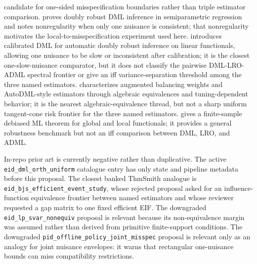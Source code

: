 \documentclass[11pt]{article}
\theoremstyle{definition}
\theoremstyle{plain}
\theoremstyle{remark}
\begin{document}
candidate for one-sided misspecification boundaries rather than triple
estimator comparison.
\citet{DukesVansteelandtWhitney2024DRDML} proves doubly robust DML inference in
semiparametric regression and notes nonregularity when only one nuisance is
consistent; that nonregularity motivates the local-to-misspecification
experiment used here.
\citet{vanDerLaanLuedtkeCarone2024CDML} introduces calibrated DML for automatic
doubly robust inference on linear functionals, allowing one nuisance to be slow
or inconsistent after calibration; it is the closest one-slow-nuisance
comparator, but it does not classify the pairwise DML-LRO-ADML spectral
frontier or give an iff variance-separation threshold among the three named
estimators.
\citet{BrunsSmithDukesFellerOgburn2024ABW} characterizes augmented balancing
weights and AutoDML-style estimators through algebraic equivalences and
tuning-dependent behavior; it is the nearest algebraic-equivalence thread, but
not a sharp uniform tangent-cone risk frontier for the three named estimators.
\citet{ChernozhukovNeweySingh2023Biometrika} gives a finite-sample debiased ML
theorem for global and local functionals; it provides a general robustness
benchmark but not an iff comparison between DML, LRO, and ADML.

In-repo prior art is currently negative rather than duplicative.  The active
\texttt{eid\_dml\_orth\_uniform} catalogue entry has only state and pipeline
metadata before this proposal.  The closest banked ThmSmith analogue is
\texttt{eid\_bjs\_efficient\_event\_study}, whose rejected proposal asked for
an influence-function equivalence frontier between named estimators and whose
reviewer requested a gap matrix to one fixed efficient EIF.  The downgraded
\texttt{eid\_lp\_svar\_nonequiv} proposal is relevant because its non-equivalence
margin was assumed rather than derived from primitive finite-support
conditions.  The downgraded
\texttt{pid\_offline\_policy\_joint\_misspec} proposal is relevant only as an
analogy for joint nuisance envelopes: it warns that rectangular one-nuisance
bounds can miss compatibility restrictions.
\end{document}
